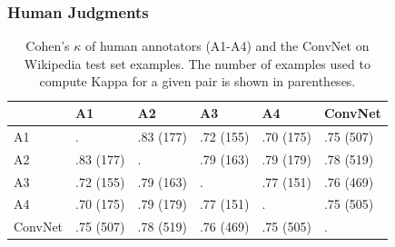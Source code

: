 \begin{frame}
\frametitle{Human Judgments}
\begin{table}
\centering
\begin{tabular}{llllll}
\hline
           &           A1 &          A2 &          A3 &          A4 &      ConvNet \\
\hline
A1           &          . &  .83 (177) &  .72 (155) &  .70 (175) &   .75 (507) \\
A2           &  .83 (177) &          . &  .79 (163) &  .79 (179) &   .78 (519) \\
A3           &  .72 (155) &  .79 (163) &          . &  .77 (151) &   .76 (469) \\
A4           &  .70 (175) &  .79 (179) &  .77 (151) &          . &   .75 (505) \\
ConvNet      &  .75 (507) &  .78 (519) &  .76 (469) &  .75 (505) &   . \\
\hline
\end{tabular}
\caption{Cohen's $\kappa$ of human annotators (A1-A4) and the ConvNet on Wikipedia test set examples.  The number of examples used to compute Kappa for a given pair is shown in parentheses.}
\end{table}
\end{frame}